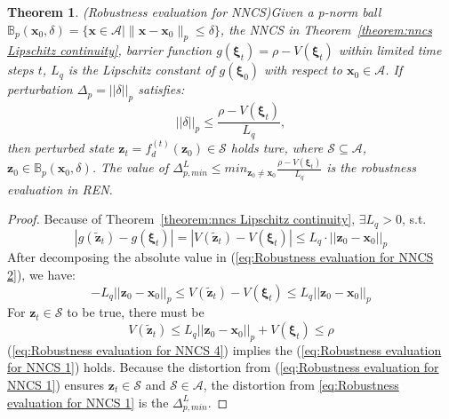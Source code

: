 \documentclass[conference]{IEEEtran}
\newtheorem{theorem}{\bf Theorem}
\newtheorem{proof}{\bf Proof}
\newcommand{\ren}{\textsc{REN}\xspace}
\newcommand{\nncs}{\textsc{NNCS}\xspace}
\newcommand{\myvec}[1]{\boldsymbol{#1}}
\newcommand{\calA}{\mathcal{A}}
\newcommand{\calS}{\mathcal{S}}
\newcommand{\bbB}{\mathbb{B}}
\begin{document}
\begin{theorem}(Robustness evaluation for \nncs)\label{theorem:Robustness evaluation for NNCS}
    Given a p-norm ball 
    $\bbB_{p}(\myvec{x}_{0},\delta) = \{ \myvec{x}\in \calA | 
    \lVert \myvec{x} - \myvec{x}_{0} \rVert_{p} \leq \delta \}$, 
    the \nncs in Theorem~\ref{theorem:nncs Lipschitz continuity}, 
    barrier function $g(\myvec{\xi}_{t}) = \rho - V(\myvec{\xi}_{t})$ 
    within limited time steps $t$, 
    $L_{q}$ is the Lipschitz constant of $g(\myvec{\xi}_{0})$ 
    with respect to $\myvec{x}_{0} \in \calA$. 
    If perturbation $\Delta_{p} = ||\delta||_{p}$ satisfies: 
    \begin{equation}\label{eq:Robustness evaluation for NNCS 1}
      ||\delta||_{p} \leq \frac{\rho - V(\myvec{\xi}_{t})}{L_q}, 
    \end{equation}
    then perturbed state $\myvec{z}_{t} = f_{d}^{(t)}(\myvec{z}_{0}) \in \calS$ holds ture, 
    where $\calS \subseteq \calA$, $\myvec{z}_{0}\in \bbB_{p}(\myvec{x}_{0},\delta)$. 
    The value of $\Delta_{p,min}^{L} 
    \leq min_{\myvec{z}_{0} \neq \myvec{x}_{0}} \frac{\rho - V(\myvec{\xi}_{t})}{L_q}$ 
    is the robustness evaluation in \ren. 
\end{theorem}

\begin{proof}\label{proof:Robustness evaluation for NNCS}
    Because of Theorem~\ref{theorem:nncs Lipschitz continuity}, $\exists L_{q} > 0$, s.t. 
    \begin{equation}\label{eq:Robustness evaluation for NNCS 2}
      |g(\tilde{\myvec{z}}_{t}) - g(\myvec{\xi}_{t})| = | V(\tilde{\myvec{z}}_{t}) - V(\myvec{\xi}_{t}) | 
      \leq L_{q} \cdot || \myvec{z}_{0} - \myvec{x}_{0} ||_{p}
    \end{equation}
    After decomposing the absolute value in (\ref{eq:Robustness evaluation for NNCS 2}), 
    we have:
    \begin{equation}\label{eq:Robustness evaluation for NNCS 3}
      -L_{q}|| \myvec{z}_{0} - \myvec{x}_{0} ||_{p} \leq
      V(\tilde{\myvec{z}}_{t}) - V(\myvec{\xi}_{t}) \leq 
      L_{q}|| \myvec{z}_{0} - \myvec{x}_{0} ||_{p}
    \end{equation}
    For $\myvec{z}_{t}\in \calS$ to be true, there must be 
    \begin{equation}\label{eq:Robustness evaluation for NNCS 4}
      V(\tilde{\myvec{z}}_{t}) \leq L_{q}|| \myvec{z}_{0} - \myvec{x}_{0} ||_{p} + V(\myvec{\xi}_{t}) 
      \leq \rho
    \end{equation}
    (\ref{eq:Robustness evaluation for NNCS 4}) implies the 
    (\ref{eq:Robustness evaluation for NNCS 1}) holds. 
    Because the distortion from (\ref{eq:Robustness evaluation for NNCS 1}) 
    ensures $\myvec{z}_{t} \in \calS$ and 
    $\calS \in \calA$, the distortion from \ref{eq:Robustness evaluation for NNCS 1} 
    is the $\Delta_{p,min}^{L}$. 
  \end{proof}
\end{document}
